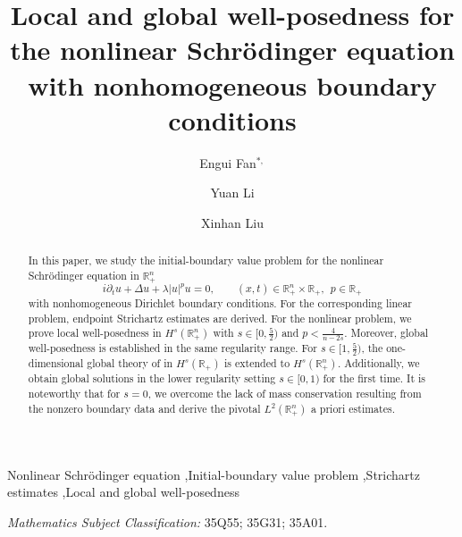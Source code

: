 \documentclass[preprint,compress,12pt]{elsarticle}
\numberwithin{equation}{section}
\begin{document}

	\begin{frontmatter}
		\title{Local and global well-posedness for the  nonlinear Schr\"{o}dinger equation  with nonhomogeneous boundary conditions}
		
		
		\author[inst1]{Engui Fan$^{*,}$  }
		\author[inst1]{Yuan Li}
		\author[inst1]{Xinhan Liu}
		\address[inst1]{ School of Mathematical Sciences and Key Laboratory for Nonlinear Science, Fudan University, Shanghai, 200433, China\\
			* Corresponding author and e-mail address: faneg@fudan.edu.cn  }
		
		
		\begin{abstract}
			In this paper, we study the initial-boundary value problem  for the nonlinear Schr\"{o}dinger equation   in $\mathbb{R}^{n}_{+}$
			\begin{equation*}
				i\partial_{t}u+\Delta u+\lambda |u|^pu=0, \qquad (x, t) \in \mathbb{R}_{+}^{n} \times \mathbb{R}_{+},\ \ p\in\mathbb{R}_{+}
			\end{equation*}
		 with nonhomogeneous Dirichlet boundary conditions. For the corresponding linear problem, endpoint Strichartz estimates  are derived. For the nonlinear problem, we prove local well-posedness in $H^{s}(\mathbb{R}^{n}_{+})$ with $s\in[0,\frac{5}{2})$ and $p<\frac{4}{n-2s}$.  Moreover, global well-posedness is established  in the same regularity range. For $s\in[1,\frac{5}{2})$, the  one-dimensional global theory of \cite{figment} in $H^{s}(\mathbb{R}_{+})$   is extended to  $H^{s}(\mathbb{R}^{n}_{+})$.
		  Additionally, we obtain global solutions in the lower regularity setting $s\in[0,1)$ for the first time.   It is noteworthy that for $s=0$, we overcome the lack of mass conservation resulting from the nonzero boundary data and derive the pivotal $L^{2}(\mathbb{R}^{n}_{+})$ a priori estimates.
		\end{abstract}
		
		\begin{keyword}
			Nonlinear Schr\"{o}dinger equation \sep Initial-boundary value problem \sep  Strichartz estimates \sep Local and global well-posedness
			
			
			\textit{Mathematics Subject Classification:} 35Q55; 35G31; 35A01.
			
		\end{keyword}
	\end{frontmatter}
	\tableofcontents
\end{document}

